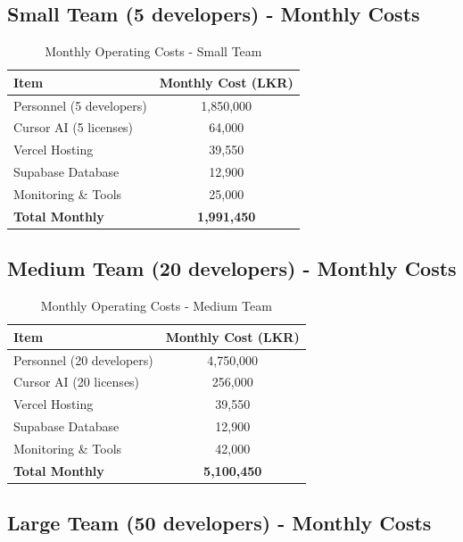 \documentclass[12pt,a4paper]{article}
\begin{document}
\subsection{Small Team (5 developers) - Monthly Costs}

\begin{table}[H]
\centering
\begin{tabular}{|l|c|}
\hline
\textbf{Item} & \textbf{Monthly Cost (LKR)} \\
\hline
Personnel (5 developers) & 1,850,000 \\
Cursor AI (5 licenses) & 64,000 \\
Vercel Hosting & 39,550 \\
Supabase Database & 12,900 \\
Monitoring \& Tools & 25,000 \\
\hline
\textbf{Total Monthly} & \textbf{1,991,450} \\
\hline
\end{tabular}
\caption{Monthly Operating Costs - Small Team}
\end{table}

\subsection{Medium Team (20 developers) - Monthly Costs}

\begin{table}[H]
\centering
\begin{tabular}{|l|c|}
\hline
\textbf{Item} & \textbf{Monthly Cost (LKR)} \\
\hline
Personnel (20 developers) & 4,750,000 \\
Cursor AI (20 licenses) & 256,000 \\
Vercel Hosting & 39,550 \\
Supabase Database & 12,900 \\
Monitoring \& Tools & 42,000 \\
\hline
\textbf{Total Monthly} & \textbf{5,100,450} \\
\hline
\end{tabular}
\caption{Monthly Operating Costs - Medium Team}
\end{table}

\subsection{Large Team (50 developers) - Monthly Costs}
\end{document}
